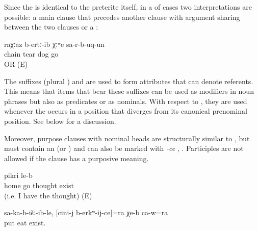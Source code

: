 Since the  is identical to the preterite itself, in a  of cases two interpretations are possible: a main clause that precedes another clause with argument sharing between the two clauses or a :
%
\begin{exe}
	\ex	
	\gll	raχːaz	b-ertː-ib	χːʷe	sa-r-b-uq-un\\
		chain	tear	dog	go\\
	\glt	{} OR  (E)
\end{exe}

The suffixes  (plural ) and  are used to form attributes that can denote referents. This means that items that bear these suffixes can be used as modifiers in noun phrases but also as predicates or as nominals. With respect to , they are used whenever the  occurs in a position that diverges from its canonical prenominal position. See  below for a discussion.

Moreover, purpose clauses with nominal heads are structurally similar to , but must contain an  (or ) and can also be marked with \textit{-ce} , . Participles are not allowed if the clause has a purposive meaning.
%
\begin{exe}
	\ex	\label{ex:There is the thought (i.e. I have the thought) to go home}
	\gll	[du	qili	uq'-ij]	pikri	le-b\\
			home	go	thought	exist \\
	\glt	{} (i.e. I have the thought) (E)

	\ex	\label{ex:‎He is also there (something) to eat that has been placed in front of him for him}
	\gll	sa-ka-b-išː-ib-le,	[cini-j	b-erkʷ-ij-ce]=ra	χe-b	ca-w=ra\\
		put		eat	exist.	\\
	\glt	{}
\end{exe}

